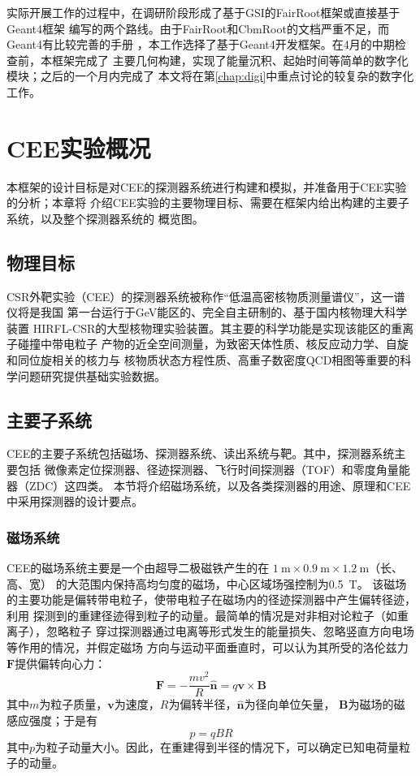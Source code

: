 \documentclass[bachelor,openany,oneside,color]{buaathesis}
\begin{document}
实际开展工作的过程中，在调研阶段形成了基于GSI的FairRoot框架或直接基于Geant4框架
编写的两个路线。由于FairRoot和CbmRoot的文档严重不足，而Geant4有比较完善的手册
\cite{Geant4}，本工作选择了基于Geant4开发框架。在4月的中期检查前，本框架完成了
主要几何构建，实现了能量沉积、起始时间等简单的数字化模块；之后的一个月内完成了
本文将在第\ref{chap:digi}中重点讨论的较复杂的数字化工作。

\chapter{CEE实验概况}

本框架的设计目标是对CEE的探测器系统进行构建和模拟，并准备用于CEE实验的分析；本章将
介绍CEE实验的主要物理目标、需要在框架内给出构建的主要子系统，以及整个探测器系统的
概览图。

\section{物理目标}

CSR外靶实验（CEE）的探测器系统被称作“低温高密核物质测量谱仪”，这一谱仪将是我国
第一台运行于\si{\giga\eV}能区的、完全自主研制的、基于国内核物理大科学装置
HIRFL-CSR的大型核物理实验装置。其主要的科学功能是实现该能区的重离子碰撞中带电粒子
产物的近全空间测量，为致密天体性质、核反应动力学、自旋和同位旋相关的核力与
核物质状态方程性质、高重子数密度QCD相图等重要的科学问题研究提供基础实验数据。
\cite{Lyu:ConceptDesign}

\section{主要子系统}

CEE的主要子系统包括磁场、探测器系统、读出系统与靶。其中，探测器系统主要包括
微像素定位探测器、径迹探测器、飞行时间探测器（TOF）和零度角量能器（ZDC）这四类。
本节将介绍磁场系统，以及各类探测器的用途、原理和CEE中采用探测器的设计要点。

\subsection{磁场系统}

CEE的磁场系统主要是一个由超导二极磁铁产生的在
$\SI{1}{\meter}\times\SI{0.9}{\meter}\times\SI{1.2}{\meter}$（长、高、宽）
的大范围内保持高均匀度的磁场，中心区域场强控制为\SI{0.5}{\tesla}。
该磁场的主要功能是偏转带电粒子，使带电粒子在磁场内的径迹探测器中产生偏转径迹，利用
探测到的重建径迹得到粒子的动量。最简单的情况是对非相对论粒子（如重离子），忽略粒子
穿过探测器通过电离等形式发生的能量损失、忽略竖直方向电场等作用的情况，并假定磁场
方向与运动平面垂直时，可以认为其所受的洛伦兹力$\bm{F}$提供偏转向心力：
\begin{equation}\label{eq:TPC:magnetic}
\bm{F} = -\frac{mv^2}{R}\hat{\bm{n}} = q\bm{v}\times\bm{B}
\end{equation}
其中$m$为粒子质量，$\bm{v}$为速度，$R$为偏转半径，$\hat{\bm{n}}$为径向单位矢量，
$\bm{B}$为磁场的磁感应强度；于是有
\begin{equation}\label{eq:TPC:momentum}
p = q B R
\end{equation}
其中$p$为粒子动量大小。因此，在重建得到半径的情况下，可以确定已知电荷量粒子的动量。
\end{document}

